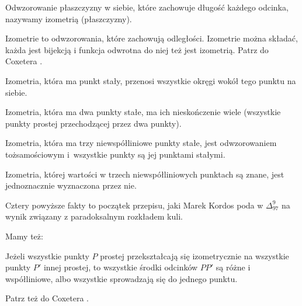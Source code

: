 
\begin{definition}
    Odwzorowanie płaszczyzny w siebie, które zachowuje długość każdego odcinka, nazywamy izometrią (płaszczyzny).
\end{definition}

Izometrie to odwzorowania, które zachowują odległości.
Izometrie można składać, każda jest bijekcją i funkcja odwrotna do niej też jest izometrią.
Patrz do Coxetera \cite[s. 45-52, 56-63]{coxeter_1967}.

\begin{proposition}
\label{delta_1997_9_start}%
    Izometria, która ma punkt stały, przenosi wszystkie okręgi wokół tego punktu na siebie.
\end{proposition}

\begin{proposition}
    Izometria, która ma dwa punkty stałe, ma ich nieskończenie wiele (wszystkie punkty prostej przechodzącej przez dwa punkty).
\end{proposition}

\begin{proposition}
    Izometria, która ma trzy niewspółliniowe punkty stałe, jest odwzorowaniem tożsamościowym i~wszystkie punkty są jej punktami stałymi.
\end{proposition}

\begin{proposition}
\label{delta_1997_9_end}%
    Izometria, której wartości w trzech niewspółliniowych punktach są znane, jest jednoznacznie wyznaczona przez nie.
\end{proposition}

Cztery powyższe fakty to początek przepisu, jaki Marek Kordos poda w $\Delta_{97}^9$ na wynik związany z paradoksalnym rozkładem kuli.

Mamy też:

\begin{theorem}[Hjelmsleva]
    Jeżeli wszystkie punkty $P$ prostej przekształcają się izometrycznie na wszystkie punkty $P'$ innej prostej, to wszystkie środki odcinków $PP'$ są różne i współliniowe, albo wszystkie sprowadzają się do jednego punktu.
\end{theorem}

Patrz też do Coxetera \cite[s. 63, 64]{coxeter_1967}.